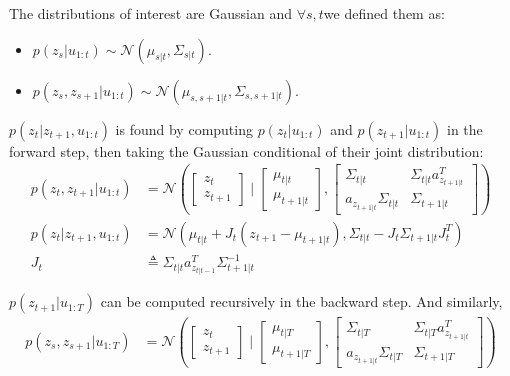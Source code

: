 \documentclass[11pt, reqno]{article}
\numberwithin{equation}{section}
\begin{document}
\noindent The distributions of interest are Gaussian and $\forall s,t$we defined them as:
\begin{itemize}
\item $p(z_s | u_{1:t}) \sim  \mathcal{N}(\mu_{s|t}, \Sigma_{s|t})$. 
\item $p(z_s, z_{s+1} | u_{1:t}) \sim \mathcal{N}\left(\mu_{s,s+1|t}, \Sigma_{s,s+1|t}\right)$. 
\end{itemize}

$p(z_t | z_{t+1}, u_{1:t})$ is found by computing $p(z_t |  u_{1:t})$ and $p(z_{t+1} | u_{1:t})$ in the forward step, then taking the Gaussian conditional of their joint distribution:
\begin{align}
p(z_t, z_{t+1} |  u_{1:t}) &= \mathcal{N}\left( 
\left[ \begin{array}{c} z_t \\ z_{t+1} \end{array} \right]
\mid 
\left[ \begin{array}{c} \mu_{t|t} \\ \mu_{t+1|t} \end{array} \right],
\left[ \begin{array}{cc} \Sigma_{t|t} & \Sigma_{t|t} a_{z_{t+1|t}}^T \\ a_{z_{t+1|t}}\Sigma_{t|t} & \Sigma_{t+1|t} \end{array}\right]  
\right)\\
p(z_t | z_{t+1}, u_{1:t}) &= \mathcal{N}(\mu_{t|t} + J_t (z_{t+1} - \mu_{t+1|t}), \Sigma_{t|t} - J_t \Sigma_{t+1|t}J_t^T) \\
J_t &\triangleq \Sigma_{t|t} a^T_{z_{t|t-1}}\Sigma^{-1}_{t+1|t}  \label{smooth2}
\end{align}

$p(z_{t+1}| u_{1:T})$ can be computed recursively in the backward step. And similarly, 
\begin{align*}
p(z_s, z_{s+1} | u_{1:T}) &= \mathcal{N}\left( 
\left[ \begin{array}{c} z_t \\ z_{t+1} \end{array} \right]
\mid 
\left[ \begin{array}{c} \mu_{t|T} \\ \mu_{t+1|T} \end{array} \right],
\left[ \begin{array}{cc} \Sigma_{t|T} & \Sigma_{t|T} a_{z_{t+1|t}}^T \\ a_{z_{t+1|t}}\Sigma_{t|T} & \Sigma_{t+1|T} \end{array}\right]  
\right)\\
\end{align*}
\end{document}
